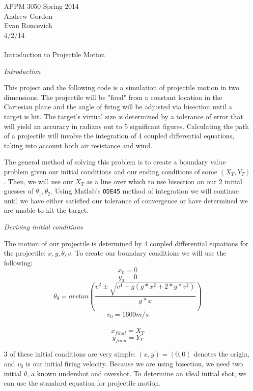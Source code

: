 \documentclass[12pt]{article}
\begin{document}
APPM 3050 Spring 2014\\
Andrew Gordon \\
Evan Roncevich\\
4/2/14\\

\hrulefill

\paragraph{}
\centerline{\huge{Introduction to Projectile Motion}}

\newpage
\begin{enumerate}

\large{\item\textit{Introduction}}

\normalsize{This project and the following code is a simulation of projectile motion in two dimensions.  The projectile will be "fired" from a constant location in the Cartesian plane and the angle of firing will be adjusted via bisection until a target is hit.  The target's virtual size is determined by a tolerance of error that will yield an accuracy in radians out to 5 significant figures.  Calculating the path of a projectile will involve the integration of 4 coupled differential equations, taking into account both air resistance and wind.  

The general method of solving this problem is to create a boundary value problem given our initial conditions and our ending conditions of some $(X_T,Y_T)$.  Then, we will use our $X_T$ as a line over which to use bisection on our 2 initial guesses of $\theta_1,\theta_2$.  Using Matlab's \texttt{ODE45} method of integration we will continue until we have either satisfied our tolerance of convergence or have determined we are unable to hit the target.}

\large{\item\textit{Deriving initial conditions}}

\normalsize{The motion of our projectile is determined by 4 coupled differential equations for the projectile:  $\dot{x}, \dot{y}, \dot{\theta}, \dot{v}$.  To create our boundary conditions we will use the following:\\

\[x_0 = 0\]
\[y_0 = 0\]
\[\theta_0 = arctan(\frac{v^2 \pm \sqrt{v^4 - g(g*x^2 + 2*y*v^2)}}{g*x}) \]
\[v_0 = 1600 m/s\]
\\
\[x_{final} = X_T\]
\[y_{final} = Y_T\]

3 of these initial conditions are very simple: $(x,y) = (0,0)$ denotes the origin, and $v_0$ is our initial firing velocity. Because we are using bisection, we need two initial $\theta$, a known undershot and overshot. To determine an ideal initial shot, we can use the standard equation for projectile motion.

}
\end{enumerate}
\end{document}
